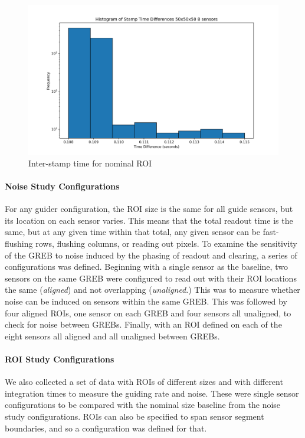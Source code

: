 \begin{figure}[ht]
    \centering
    \includegraphics[width=0.95\linewidth]{figures/guider_timing.png}
    \caption{Inter-stamp time for nominal ROI}
    \label{fig:guider_timing}
\end{figure}

\paragraph*{Noise Study Configurations}
For any guider configuration, the ROI size is the same for all guide sensors, but its location on each sensor varies. This means that the total readout time is the same, but at any given time within that total, any given sensor can be fast-flushing rows, flushing columns, or reading out pixels. To examine the sensitivity of the GREB to noise induced by the phasing of readout and clearing, a series of configurations was defined. Beginning with a single sensor as the baseline, two sensors on the same GREB were configured to read out with their ROI locations the same (\textit{aligned}) and not overlapping (\textit{unaligned}.) This was to measure whether noise can be induced on sensors within the same GREB. This was followed by four aligned ROIs, one sensor on each GREB and four sensors all unaligned, to check for noise between GREBs. Finally, with an ROI defined on each of the eight sensors all aligned and all unaligned between GREBs.

\paragraph*{ROI Study Configurations}
We also collected a set of data with ROIs of different sizes and with different integration times to measure the guiding rate and noise. These were single sensor configurations to be compared with the nominal size baseline from the noise study configurations. ROIs can also be specified to span sensor segment boundaries, and so a configuration was defined for that.

